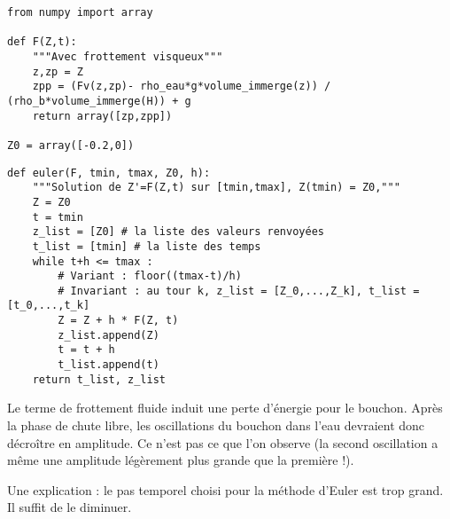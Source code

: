 \begin{lstlisting}
from numpy import array

def F(Z,t):
    """Avec frottement visqueux"""
    z,zp = Z
    zpp = (Fv(z,zp)- rho_eau*g*volume_immerge(z)) / (rho_b*volume_immerge(H)) + g
    return array([zp,zpp])
    
Z0 = array([-0.2,0])
\end{lstlisting}

\question{} 

\begin{lstlisting}
def euler(F, tmin, tmax, Z0, h):
    """Solution de Z'=F(Z,t) sur [tmin,tmax], Z(tmin) = Z0,"""
    Z = Z0
    t = tmin
    z_list = [Z0] # la liste des valeurs renvoyées
    t_list = [tmin] # la liste des temps
    while t+h <= tmax : 
        # Variant : floor((tmax-t)/h)
        # Invariant : au tour k, z_list = [Z_0,...,Z_k], t_list = [t_0,...,t_k]
        Z = Z + h * F(Z, t)
        z_list.append(Z)
        t = t + h
        t_list.append(t)
    return t_list, z_list
\end{lstlisting}

\question{} 
Le terme de frottement fluide induit une perte d'énergie pour le bouchon. Après la phase de chute libre, les oscillations du bouchon dans l'eau devraient donc décroître en amplitude.
Ce n'est pas ce que l'on observe (la second oscillation a même une amplitude légèrement plus grande que la première !).

Une explication : le pas temporel choisi pour la méthode d'Euler est trop grand. Il suffit de le diminuer.

